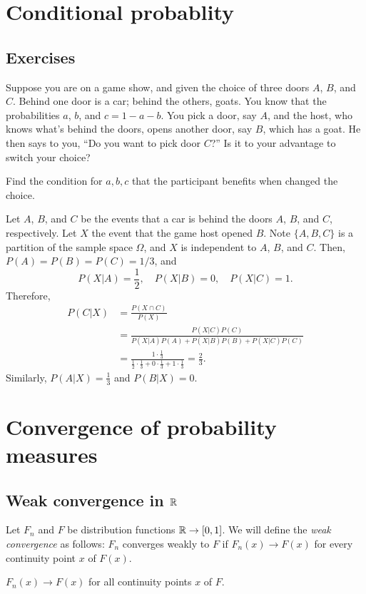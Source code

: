 \documentclass{../../large}
\begin{document}
\chapter{Conditional probablity}

\section*{Exercises}

\begin{prb}
Suppose you are on a game show, and given the choice of three doors $A$, $B$, and $C$.
Behind one door is a car; behind the others, goats.
You know that the probabilities $a$, $b$, and $c=1-a-b$.
You pick a door, say $A$, and the host, who knows what's behind the doors, opens another door, say $B$, which has a goat.
He then says to you, ``Do you want to pick door $C$?''
Is it to your advantage to switch your choice?
\begin{parts}
\item Find the condition for $a,b,c$ that the participant benefits when changed the choice.
\end{parts}
\end{prb}
\begin{pf}
Let $A$, $B$, and $C$ be the events that a car is behind the doors $A$, $B$, and $C$, respectively.
Let $X$ the event that the game host opened $B$.
Note $\{A,B,C\}$ is a partition of the sample space $\Omega$, and $X$ is independent to $A$, $B$, and $C$.
Then, $P(A)=P(B)=P(C)=1/3$, and
\[P(X|A)=\frac12,\quad P(X|B)=0,\quad P(X|C)=1.\]
Therefore,
\begin{align*}
P(C|X)&=\frac{P(X\cap C)}{P(X)}\\
&=\frac{P(X|C)P(C)}{P(X|A)P(A)+P(X|B)P(B)+P(X|C)P(C)}\\
&=\frac{1\cdot \frac13}{\frac12\cdot\frac13+0\cdot\frac13+1\cdot\frac13}=\frac23.
\end{align*}
Similarly, $P(A|X)=\frac13$ and $P(B|X)=0$.
\end{pf}










\chapter{Convergence of probability measures}


\section{Weak convergence in $\mathbb{R}$}
\begin{prb}
Let $F_n$ and $F$ be distribution functions $\mathbb{R}\to[0,1]$.
We will define the \emph{weak convergence} as follows: $F_n$ converges weakly to $F$ if $F_n(x)\to F(x)$ for every continuity point $x$ of $F(x)$.
\begin{parts}
\item $F_n(x)\to F(x)$ for all continuity points $x$ of $F$.
\end{parts}
\end{prb}
\end{document}

